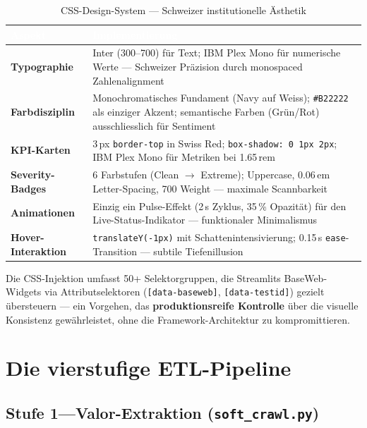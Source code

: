 \documentclass[11pt, a4paper, oneside, openany]{report}
\newcommand{\code}[1]{\texttt{\small\textcolor{DeepNavy}{#1}}}
\begin{document}
\begin{table}[H]
\centering
\caption{CSS-Design-System --- Schweizer institutionelle Ästhetik}
\label{tab:css}
\sffamily\small
\begin{tabularx}{\textwidth}{>{\bfseries}p{3cm} X}
  \toprule
  \rowcolor{DeepNavy} \textcolor{white}{\textbf{Aspekt}} & \textcolor{white}{\textbf{Implementierung}} \\
  \midrule
  Typographie        & Inter (300--700) für Text; IBM Plex Mono für numerische Werte --- Schweizer Präzision durch monospaced Zahlenalignment \\
  Farbdisziplin      & Monochromatisches Fundament (Navy auf Weiss); \code{\#B22222} als einziger Akzent; semantische Farben (Grün/Rot) ausschliesslich für Sentiment \\
  KPI-Karten         & 3\,px \code{border-top} in Swiss Red; \code{box-shadow: 0 1px 2px}; IBM Plex Mono für Metriken bei 1.65\,rem \\
  Severity-Badges    & 6 Farbstufen (Clean $\to$ Extreme); Uppercase, 0.06\,em Letter-Spacing, 700 Weight --- maximale Scannbarkeit \\
  Animationen        & Einzig ein Pulse-Effekt (2\,s Zyklus, 35\,\% Opazität) für den Live-Status-Indikator --- funktionaler Minimalismus \\
  Hover-Interaktion  & \code{translateY(-1px)} mit Schattenintensivierung; 0.15\,s \code{ease}-Transition --- subtile Tiefenillusion \\
  \bottomrule
\end{tabularx}
\end{table}

\begin{insightbox}
Die CSS-Injektion umfasst 50+ Selektorgruppen, die Streamlits BaseWeb-Widgets via Attributselektoren (\code{[data-baseweb]}, \code{[data-testid]}) gezielt übersteuern --- ein Vorgehen, das \textbf{produktionsreife Kontrolle} über die visuelle Konsistenz gewährleistet, ohne die Framework-Architektur zu kompromittieren.
\end{insightbox}

\section{Die vierstufige ETL-Pipeline}

\subsection{Stufe 1\;---\;Valor-Extraktion (\code{soft\_crawl.py})}
\end{document}
